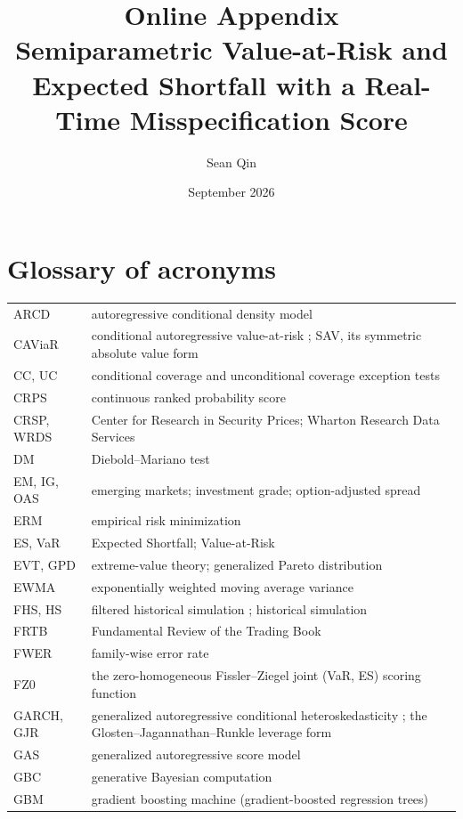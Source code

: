 \documentclass[11pt]{article}
\title{Online Appendix\\ \large Semiparametric Value-at-Risk and Expected Shortfall with a Real-Time Misspecification Score}
\author{Sean Qin}
\date{September 2026}
\begin{document}
\maketitle
\section{Glossary of acronyms}
\begin{tabular}{@{}lp{}@{}}
\toprule
ARCD & autoregressive conditional density model \citep{hansen1994ARCD} \\
CAViaR & conditional autoregressive value-at-risk \citep{engle2004caviar}; SAV, its symmetric absolute value form \\
CC, UC & conditional coverage \citep{christoffersen1998} and unconditional coverage \citep{kupiec1995} exception tests \\
CRPS & continuous ranked probability score \\
CRSP, WRDS & Center for Research in Security Prices; Wharton Research Data Services \\
DM & Diebold--Mariano test \citep{dieboldmariano1995} \\
EM, IG, OAS & emerging markets; investment grade; option-adjusted spread \\
ERM & empirical risk minimization \\
ES, VaR & Expected Shortfall; Value-at-Risk \\
EVT, GPD & extreme-value theory; generalized Pareto distribution \\
EWMA & exponentially weighted moving average variance \citep{riskmetrics1996} \\
FHS, HS & filtered historical simulation \citep{baroneadesi1999fhs}; historical simulation \\
FRTB & Fundamental Review of the Trading Book \citep{bcbs2019frtb} \\
FWER & family-wise error rate \\
FZ0 & the zero-homogeneous Fissler--Ziegel joint (VaR, ES) scoring function \citep{fissler2016, patton2019} \\
GARCH, GJR & generalized autoregressive conditional heteroskedasticity \citep{bollerslev1986}; the Glosten--Jagannathan--Runkle leverage form \citep{glosten1993} \\
GAS & generalized autoregressive score model \citep{patton2019} \\
GBC & generative Bayesian computation \citep{polson2023gbc} \\
GBM & gradient boosting machine (gradient-boosted regression trees) \\

\end{tabular}
\end{document}
